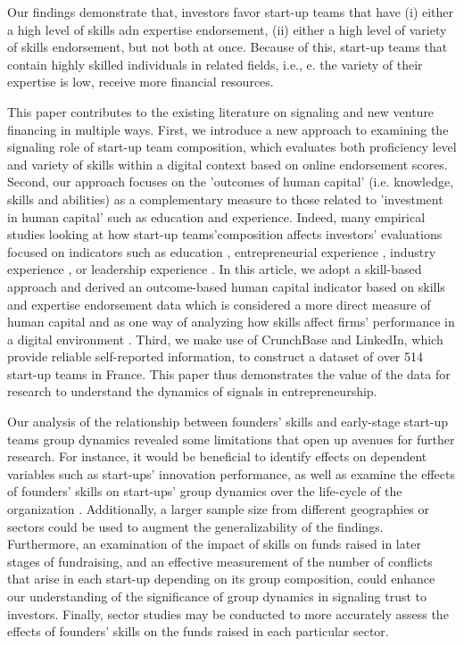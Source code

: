 \documentclass[12pt]{article}
\begin{document}
Our findings demonstrate that, investors favor start-up teams that have (i) either a high level of skills adn expertise endorsement, (ii) either a high level of variety of skills endorsement, but not both at once. Because of this, start-up teams that contain highly skilled individuals in related fields, i.e., e. the variety of their expertise is low, receive more financial resources.

This paper contributes to the existing literature on signaling and new venture financing in multiple ways. First, we introduce a new approach to examining the signaling role of start-up team composition, which evaluates both proficiency level and variety of skills within a digital context based on online endorsement scores. Second, our approach focuses on the 'outcomes of human capital' (i.e. knowledge, skills and abilities) as a complementary measure to those related to 'investment in human capital' such as education and experience. Indeed, many empirical studies looking at how start-up teams'composition affects investors' evaluations focused on indicators such as education \citep{franke2008venture}, entrepreneurial experience \citep{beckman2007early}, industry experience \citep{becker2015new}, or leadership experience \citep{hoenig2015quality}. In this article, we adopt a skill-based approach and derived an outcome-based human capital indicator based on skills and expertise endorsement data which is considered a more direct measure of human capital and as one way of analyzing how skills affect firms' performance in a digital environment \citep{marvel2016human}. Third, we make use of CrunchBase and LinkedIn, which provide reliable self-reported information, to construct a dataset of over 514 start-up teams in France. This paper thus demonstrates the value of the data for research to understand the dynamics of signals in entrepreneurship.

Our analysis of the relationship between founders' skills and early-stage start-up teams group dynamics revealed some limitations that open up avenues for further research. For instance, it would be beneficial to identify effects on dependent variables such as start-ups' innovation performance, as well as examine the effects of founders' skills on start-ups' group dynamics over the life-cycle of the organization \citep{knight2020start}. Additionally, a larger sample size from different geographies or sectors could be used to augment the generalizability of the findings. Furthermore, an examination of the impact of skills on funds raised in later stages of fundraising, and an effective measurement of the number of conflicts that arise in each start-up depending on its group composition, could enhance our understanding of the significance of group dynamics in signaling trust to investors. Finally, sector studies may be conducted to more accurately assess the effects of founders' skills on the funds raised in each particular sector.
\end{document}
